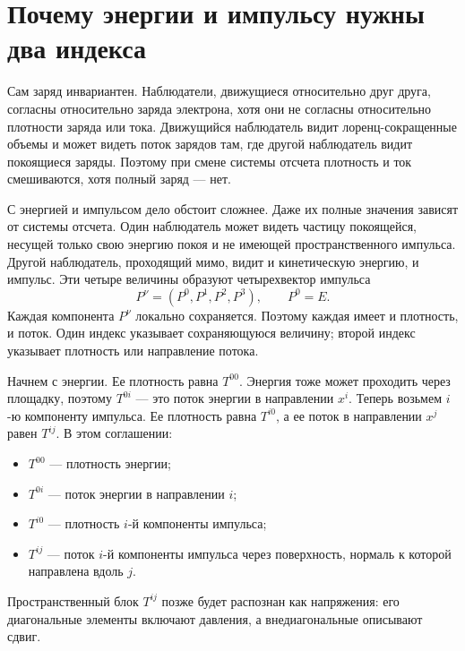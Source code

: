 \section{Почему энергии и импульсу нужны два индекса}

Сам заряд инвариантен. Наблюдатели, движущиеся относительно друг друга, согласны относительно заряда электрона, хотя они не согласны относительно плотности заряда или тока. Движущийся наблюдатель видит лоренц-сокращенные объемы и может видеть поток зарядов там, где другой наблюдатель видит покоящиеся заряды. Поэтому при смене системы отсчета плотность и ток смешиваются, хотя полный заряд — нет.

С энергией и импульсом дело обстоит сложнее. Даже их полные значения зависят от системы отсчета. Один наблюдатель может видеть частицу покоящейся, несущей только свою энергию покоя и не имеющей пространственного импульса. Другой наблюдатель, проходящий мимо, видит и кинетическую энергию, и импульс. Эти четыре величины образуют четырехвектор импульса
\begin{equation}
 P^\nu=(P^0,P^1,P^2,P^3),
 \qquad P^0=E.
\end{equation}
Каждая компонента \(P^\nu\) локально сохраняется. Поэтому каждая имеет и плотность, и поток. Один индекс указывает сохраняющуюся величину; второй индекс указывает плотность или направление потока.

Начнем с энергии. Ее плотность равна \(T^{00}\). Энергия тоже может проходить через площадку, поэтому \(T^{0i}\) — это поток энергии в направлении \(x^i\). Теперь возьмем \(i\)-ю компоненту импульса. Ее плотность равна \(T^{i0}\), а ее поток в направлении \(x^j\) равен \(T^{ij}\). В этом соглашении:
\begin{itemize}
 \item \(T^{00}\) — плотность энергии;
 \item \(T^{0i}\) — поток энергии в направлении \(i\);
 \item \(T^{i0}\) — плотность \(i\)-й компоненты импульса;
 \item \(T^{ij}\) — поток \(i\)-й компоненты импульса через поверхность, нормаль к которой направлена вдоль \(j\).
\end{itemize}
Пространственный блок \(T^{ij}\) позже будет распознан как напряжения: его диагональные элементы включают давления, а внедиагональные описывают сдвиг.

\begin{classroomqa}
\end{classroomqa}

